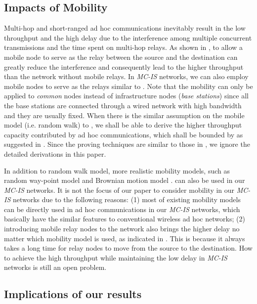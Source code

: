 \documentclass[10pt,journal]{IEEEtran}
\begin{document}
\subsection{Impacts of Mobility}
\label{subsec:mobility}

Multi-hop and short-ranged ad hoc communications inevitably result in the low throughput and the high delay due to the interference among multiple concurrent transmissions and the time spent on multi-hop relays. As shown in \cite{DTSE:TON2002}, to allow a mobile node to serve as the relay between the source and the destination can greatly reduce the interference and consequently lead to the higher throughput than the network without mobile relays. In \emph{MC-IS} networks, we can also employ mobile nodes to serve as the relays similar to \cite{DTSE:TON2002}. Note that the mobility can only be applied to \emph{common} nodes instead of infrastructure nodes (\emph{base stations}) since all the base stations are connected through a wired network with high bandwidth and they are usually fixed. When there is the similar assumption on the mobile model (i.e. random walk) to \cite{DTSE:TON2002}, we shall be able to derive the higher throughput capacity contributed by ad hoc communications, which shall be bounded by  as suggested in \cite{DTSE:TON2002}. Since the proving techniques are similar to those in \cite{DTSE:TON2002}, we ignore the detailed derivations in this paper. 

In addition to random walk model, more realistic mobility models, such as random way-point model \cite{Sharma:ICC04} and Brownian motion model \cite{Xlin:TIT2006}. can also be used in our \emph{MC-IS} networks. It is not the focus of our paper to consider mobility in our \emph{MC-IS} networks due to the following reasons:
(1) most of existing mobility models can be directly used in ad hoc communications in our \emph{MC-IS} networks, which basically have the similar features to conventional wireless ad hoc networks; (2) introducing mobile relay nodes to the network also brings the higher delay no matter which mobility model is used, as indicated in \cite{Sharma:ICC04,Xlin:TIT2006,gamal:TIT2006}. This is because it always takes a long time for relay nodes to move from the source to the destination. How to achieve the high throughput while maintaining the low delay in \emph{MC-IS} networks is still an open problem. 

\subsection{Implications of our results}
\label{subsec:implications}
\end{document}
